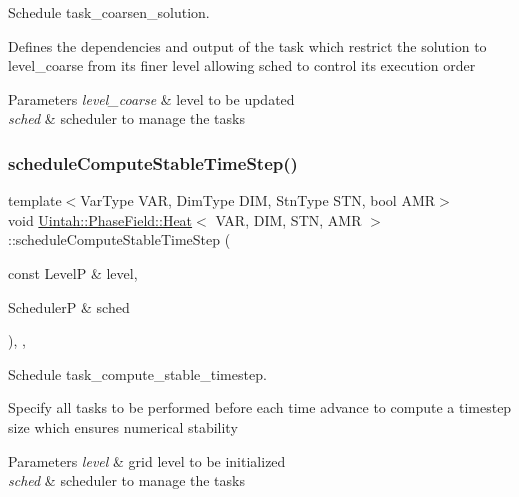 Schedule task\+\_\+coarsen\+\_\+solution. 

Defines the dependencies and output of the task which restrict the solution to level\+\_\+coarse from its finer level allowing sched to control its execution order


\begin{DoxyParams}{Parameters}
{\em level\+\_\+coarse} & level to be updated \\
\hline
{\em sched} & scheduler to manage the tasks \\
\hline
\end{DoxyParams}
\mbox{\label{classUintah_1_1PhaseField_1_1Heat_a849225b20f1e31b74339046b9ba2d937}} 
\subsubsection{\texorpdfstring{schedule\+Compute\+Stable\+Time\+Step()}{scheduleComputeStableTimeStep()}}
{\footnotesize\ttfamily template$<$Var\+Type V\+AR, Dim\+Type D\+IM, Stn\+Type S\+TN, bool A\+MR$>$ \\
void \hyperlink{classUintah_1_1PhaseField_1_1Heat}{Uintah\+::\+Phase\+Field\+::\+Heat}$<$ V\+AR, D\+IM, S\+TN, A\+MR $>$\+::schedule\+Compute\+Stable\+Time\+Step (\begin{DoxyParamCaption}\item[{const LevelP \&}]{level,  }\item[{SchedulerP \&}]{sched }\end{DoxyParamCaption})\hspace{0.3cm}{\ttfamily [override]}, {\ttfamily [protected]}, {\ttfamily [virtual]}}



Schedule task\+\_\+compute\+\_\+stable\+\_\+timestep. 

Specify all tasks to be performed before each time advance to compute a timestep size which ensures numerical stability


\begin{DoxyParams}{Parameters}
{\em level} & grid level to be initialized \\
\hline
{\em sched} & scheduler to manage the tasks \\
\hline
\end{DoxyParams}
\mbox{\label{classUintah_1_1PhaseField_1_1Heat_af7b0ce1990eeca4e11e3c65ce57dac8f}} 
